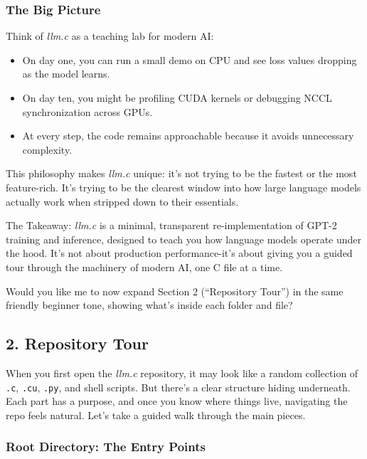 \documentclass[
  letterpaper,
  DIV=11,
  numbers=noendperiod]{scrreprt}
\providecommand{\tightlist}{%
  \setlength{\itemsep}{0pt}\setlength{\parskip}{0pt}}
\begin{document}
\subsubsection{The Big Picture}\label{the-big-picture}

Think of \emph{llm.c} as a teaching lab for modern AI:

\begin{itemize}
\tightlist
\item
  On day one, you can run a small demo on CPU and see loss values
  dropping as the model learns.
\item
  On day ten, you might be profiling CUDA kernels or debugging NCCL
  synchronization across GPUs.
\item
  At every step, the code remains approachable because it avoids
  unnecessary complexity.
\end{itemize}

This philosophy makes \emph{llm.c} unique: it's not trying to be the
fastest or the most feature-rich. It's trying to be the clearest window
into how large language models actually work when stripped down to their
essentials.

The Takeaway: \emph{llm.c} is a minimal, transparent re-implementation
of GPT-2 training and inference, designed to teach you how language
models operate under the hood. It's not about production
performance-it's about giving you a guided tour through the machinery of
modern AI, one C file at a time.

Would you like me to now expand Section 2 (``Repository Tour'') in the
same friendly beginner tone, showing what's inside each folder and file?

\subsection{2. Repository Tour}\label{repository-tour}

When you first open the \emph{llm.c} repository, it may look like a
random collection of \texttt{.c}, \texttt{.cu}, \texttt{.py}, and shell
scripts. But there's a clear structure hiding underneath. Each part has
a purpose, and once you know where things live, navigating the repo
feels natural. Let's take a guided walk through the main pieces.

\subsubsection{Root Directory: The Entry
Points}\label{root-directory-the-entry-points}
\end{document}

